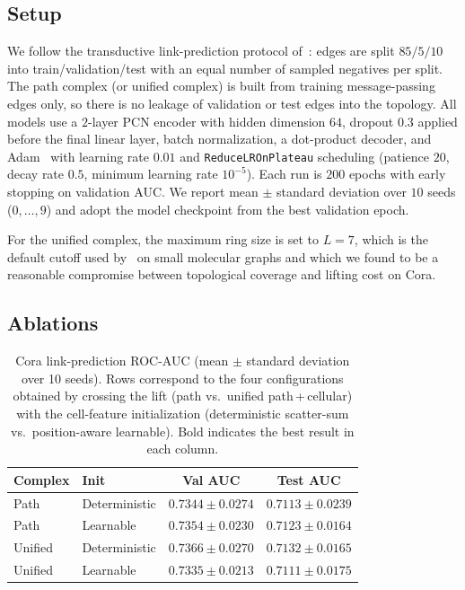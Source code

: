 \documentclass{article}
\begin{document}
\subsection{Setup}
\label{subsec:setup}
We follow the transductive link-prediction protocol of~\citet{kipf_variational_2016}: edges are split $85/5/10$ into train/validation/test with an equal number of sampled negatives per split. The path complex (or unified complex) is built from training message-passing edges only, so there is no leakage of validation or test edges into the topology. All models use a $2$-layer PCN encoder with hidden dimension $64$, dropout $0.3$ applied before the final linear layer, batch normalization, a dot-product decoder, and Adam~\citep{kingma_adam_2015} with learning rate $0.01$ and \texttt{ReduceLROnPlateau} scheduling (patience $20$, decay rate $0.5$, minimum learning rate $10^{-5}$). Each run is $200$ epochs with early stopping on validation AUC. We report mean $\pm$ standard deviation over $10$ seeds ($0, \ldots, 9$) and adopt the model checkpoint from the best validation epoch.

For the unified complex, the maximum ring size is set to $L = 7$, which is the default cutoff used by~\citet{bodnar_weisfeiler_2022} on small molecular graphs and which we found to be a reasonable compromise between topological coverage and lifting cost on Cora.

\subsection{Ablations}
\label{subsec:ablations}

\begin{table}[t]
  \centering
  \caption{Cora link-prediction ROC-AUC (mean $\pm$ standard deviation over 10 seeds). Rows correspond to the four configurations obtained by crossing the lift (path vs.\ unified path\,+\,cellular) with the cell-feature initialization (deterministic scatter-sum vs.\ position-aware learnable). Bold indicates the best result in each column.}
  \label{tab:ablation}
  \begin{tabular}{llcc}
    \toprule
    Complex & Init & Val AUC & Test AUC \\
    \midrule
    Path    & Deterministic & $0.7344 \pm 0.0274$ & $0.7113 \pm 0.0239$ \\
    Path    & Learnable     & $0.7354 \pm 0.0230$ & $0.7123 \pm 0.0164$ \\
    Unified & Deterministic & $\mathbf{0.7366 \pm 0.0270}$ & $\mathbf{0.7132 \pm 0.0165}$ \\
    Unified & Learnable     & $0.7335 \pm 0.0213$ & $0.7111 \pm 0.0175$ \\
    \bottomrule
  \end{tabular}
\end{table}
\end{document}
